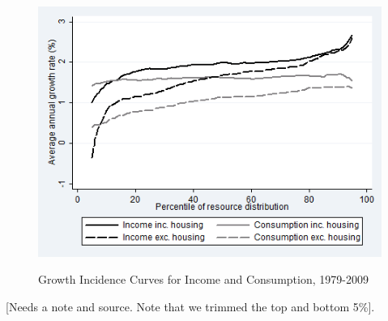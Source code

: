 \begin{figure}
\caption{Growth Incidence Curves for Income and Consumption, 1979-2009}
\centering
\includegraphics[width=.8\linewidth]{pictures/gic_7.png}
\label{fig:gicall}
\end{figure}

[Needs a note and source. Note that we trimmed the top and bottom 5\%].

